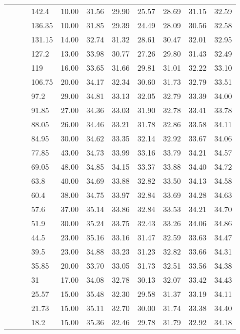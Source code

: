 \begin{longtable}{llllrrrrrrr}
   &  &  & 142.4 & 10.00 & 31.56 & 29.90 & 25.57 & 28.69 & 31.15 & 32.59 \\ 
   &  &  & 136.35 & 10.00 & 31.85 & 29.39 & 24.49 & 28.09 & 30.56 & 32.58 \\ 
   &  &  & 131.15 & 14.00 & 32.74 & 31.32 & 28.61 & 30.47 & 32.01 & 32.95 \\ 
   &  &  & 127.2 & 13.00 & 33.98 & 30.77 & 27.26 & 29.80 & 31.43 & 32.49 \\ 
   &  &  & 119 & 16.00 & 33.65 & 31.66 & 29.81 & 31.01 & 32.22 & 33.10 \\ 
   &  &  & 106.75 & 20.00 & 34.17 & 32.34 & 30.60 & 31.73 & 32.79 & 33.51 \\ 
   &  &  & 97.2 & 29.00 & 34.81 & 33.13 & 32.05 & 32.79 & 33.39 & 34.00 \\ 
   &  &  & 91.85 & 27.00 & 34.36 & 33.03 & 31.90 & 32.78 & 33.41 & 33.78 \\ 
   &  &  & 88.05 & 26.00 & 34.46 & 33.21 & 31.78 & 32.86 & 33.58 & 34.11 \\ 
   &  &  & 84.95 & 30.00 & 34.62 & 33.35 & 32.14 & 32.92 & 33.67 & 34.06 \\ 
   &  &  & 77.85 & 43.00 & 34.73 & 33.99 & 33.16 & 33.79 & 34.21 & 34.57 \\ 
   &  &  & 69.05 & 48.00 & 34.85 & 34.15 & 33.37 & 33.88 & 34.40 & 34.72 \\ 
   &  &  & 63.8 & 40.00 & 34.69 & 33.88 & 32.82 & 33.50 & 34.13 & 34.58 \\ 
   &  &  & 60.4 & 38.00 & 34.75 & 33.97 & 32.84 & 33.69 & 34.28 & 34.63 \\ 
   &  &  & 57.6 & 37.00 & 35.14 & 33.86 & 32.84 & 33.53 & 34.21 & 34.70 \\ 
   &  &  & 51.9 & 30.00 & 35.24 & 33.75 & 32.43 & 33.26 & 34.06 & 34.86 \\ 
   &  &  & 44.5 & 23.00 & 35.16 & 33.16 & 31.47 & 32.59 & 33.63 & 34.47 \\ 
   &  &  & 39.5 & 23.00 & 34.88 & 33.23 & 31.23 & 32.82 & 33.66 & 34.31 \\ 
   &  &  & 35.85 & 20.00 & 33.70 & 33.05 & 31.73 & 32.51 & 33.56 & 34.38 \\ 
   &  &  & 31 & 17.00 & 34.08 & 32.78 & 30.13 & 32.07 & 33.42 & 34.43 \\ 
   &  &  & 25.57 & 15.00 & 35.48 & 32.30 & 29.58 & 31.37 & 33.19 & 34.11 \\ 
   &  &  & 21.73 & 15.00 & 35.11 & 32.70 & 30.00 & 31.74 & 33.38 & 34.40 \\ 
   &  &  & 18.2 & 15.00 & 35.36 & 32.46 & 29.78 & 31.79 & 32.92 & 34.18 \\ 

\end{longtable}

